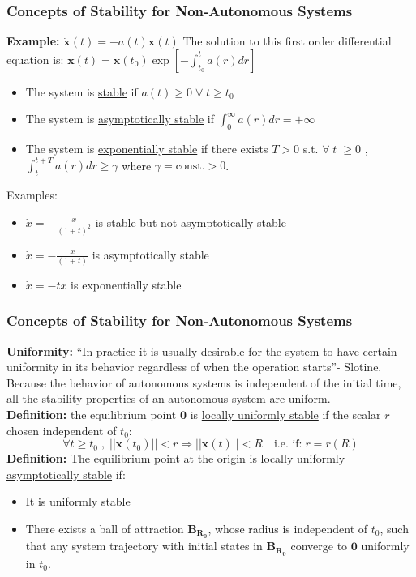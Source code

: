 \documentclass[11pt,handout]{beamer}   %
\begin{document}
\begin{frame}
\frametitle{Concepts of Stability for Non-Autonomous Systems}
\small
\textbf{Example:} $\mathbf{\dot{x}}(t) = -a(t)\mathbf{x}(t)$
The solution to this first order differential equation is: $\mathbf{x}(t) = \mathbf{x}(t_0) \exp \left[  -\int_{t_0}^{t} a(r) dr \right]$\\
\begin{itemize}
\item The system is \underline{stable} if $a(t) \geq 0 \; \forall \; t\geq t_0$
\item The system is \underline{asymptotically stable} if $\int_{0}^{\infty} a(r) dr = +\infty$
\item The system is \underline{exponentially stable} if there exists $T>0$ s.t. $\forall \; t \; \geq 0$ , $\int_{t}^{t+T} a(r) dr \geq \gamma $ where $\gamma = \text{const.} > 0$. 
\end{itemize}
Examples:
\begin{itemize}
\item ${\dot{x}} = - \frac{x}{(1+t)^2}$ is stable but not asymptotically stable
\item ${\dot{x}} = - \frac{x}{(1+t)}$ is asymptotically stable
\item ${\dot{x}} = - t x$ is exponentially stable
\end{itemize}
\end{frame}

\begin{frame}
\frametitle{Concepts of Stability for Non-Autonomous Systems}
\small
\textbf{Uniformity:} ``In practice it is usually desirable for the system to have certain uniformity in its behavior regardless of when the operation starts''- Slotine. Because the behavior of autonomous systems is independent of the initial time, all the stability properties of an autonomous system are uniform.\\
\vspace{6pt}
\textbf{Definition:} the equilibrium point $\mathbf{0}$ is \underline{locally uniformly stable} if the scalar $r$ chosen independent of $t_0$:
\begin{equation*}
\forall t \geq t_0 \; , \; ||\mathbf{x}(t_0)|| < r \Rightarrow ||\mathbf{x}(t)|| < R \quad  \text{i.e. if:} \; r = r(R)
\end{equation*}
\textbf{Definition:} The equilibrium point at the origin is locally \underline{uniformly asymptotically stable} if:
\begin{itemize}
\item It is uniformly stable
\item There exists a ball of attraction $\mathbf{B_{R_0}}$, whose radius is independent of $t_0$, such that any system trajectory with initial states in $\mathbf{B_{R_0}}$ converge to $\mathbf{0}$ uniformly in $t_0$.
\end{itemize}
\end{frame}
\end{document}
